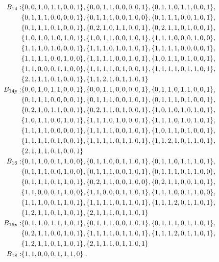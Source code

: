 \documentclass[11pt,a4paper]{article}
\begin{document}
\begin{align}
%
B_{14} :&
\{0, 0, 1, 0, 1, 1, 0, 0, 1\}, \{0, 0, 1, 1, 0, 0, 0, 0, 1\}, \{0, 1, 1, 0, 1, 1, 0, 0, 1\},  \nn
\{0, 1, 1, 1, 0, 0, 0, 0, 1\}, \{0, 1, 1, 1, 0, 0, 1, 0, 0\}, \{0, 1, 1, 1, 0, 0, 1, 0, 1\},  \nn
\{0, 1, 1, 1, 0, 1, 0, 0, 1\}, \{0, 2, 1, 0, 1, 1, 0, 0, 1\}, \{0, 2, 1, 1, 0, 1, 0, 0, 1\},  \nn
\{1, 0, 1, 0, 1, 0, 1, 0, 1\}, \{1, 0, 1, 1, 0, 0, 1, 0, 1\}, \{1, 1, 1, 0, 0, 0, 1, 0, 0\},  \nn
\{1, 1, 1, 0, 1, 0, 0, 0, 1\}, \{1, 1, 1, 0, 1, 0, 1, 0, 1\}, \{1, 1, 1, 1, 0, 0, 0, 0, 1\},  \nn
\{1, 1, 1, 1, 0, 0, 1, 0, 0\}, \{1, 1, 1, 1, 0, 0, 1, 0, 1\}, \{1, 0, 1, 1, 0, 1, 0, 0, 1\},  \nn
\{1, 1, 0, 0, 0, 1, 1, 0, 0\}, \{1, 1, 1, 1, 0, 1, 0, 0, 1\}, \{1, 1, 1, 1, 0, 1, 1, 0, 1\},  \nn
\{2, 1, 1, 1, 0, 1, 0, 0, 1\}, \{1, 1, 2, 1, 0, 1, 1, 0, 1\}
\nonumber\\
%
B_{14p} :&
\{0, 0, 1, 0, 1, 1, 0, 0, 1\}, \{0, 0, 1, 1, 0, 0, 0, 0, 1\}, \{0, 1, 1, 0, 1, 1, 0, 0, 1\},  \nn
\{0, 1, 1, 1, 0, 0, 0, 0, 1\}, \{0, 1, 1, 1, 0, 0, 1, 0, 1\}, \{0, 1, 1, 1, 0, 1, 0, 0, 1\},  \nn
\{0, 2, 1, 0, 1, 1, 0, 0, 1\}, \{0, 2, 1, 1, 0, 1, 0, 0, 1\}, \{1, 0, 1, 0, 1, 0, 1, 0, 1\},  \nn
\{1, 0, 1, 1, 0, 0, 1, 0, 1\}, \{1, 1, 1, 0, 1, 0, 0, 0, 1\}, \{1, 1, 1, 0, 1, 0, 1, 0, 1\},  \nn
\{1, 1, 1, 1, 0, 0, 0, 0, 1\}, \{1, 1, 1, 1, 0, 0, 1, 0, 1\}, \{1, 0, 1, 1, 0, 1, 0, 0, 1\},  \nn
\{1, 1, 1, 1, 0, 1, 0, 0, 1\}, \{1, 1, 1, 1, 0, 1, 1, 0, 1\}, \{1, 1, 2, 1, 0, 1, 1, 0, 1\},  \nn
\{2, 1, 1, 1, 0, 1, 0, 0, 1\}
\nonumber\\
%
B_{16} :&
\{0, 1, 1, 0, 0, 1, 1, 0, 0\}, \{0, 1, 1, 0, 0, 1, 1, 0, 1\}, \{0, 1, 1, 0, 1, 1, 1, 0, 1\},  \nn
\{0, 1, 1, 1, 0, 0, 1, 0, 0\}, \{0, 1, 1, 1, 0, 0, 1, 0, 1\}, \{0, 1, 1, 1, 0, 1, 1, 0, 0\},  \nn
\{0, 1, 1, 1, 0, 1, 1, 0, 1\}, \{0, 2, 1, 1, 0, 0, 1, 0, 0\}, \{0, 2, 1, 1, 0, 0, 1, 0, 1\},  \nn
\{1, 1, 0, 0, 0, 1, 1, 0, 0\}, \{1, 1, 0, 0, 0, 1, 1, 0, 1\}, \{1, 1, 1, 0, 0, 1, 1, 0, 0\},  \nn
\{1, 1, 1, 0, 0, 1, 1, 0, 1\}, \{1, 1, 1, 1, 0, 1, 1, 0, 1\}, \{1, 1, 1, 2, 0, 1, 1, 0, 1\},  \nn
\{1, 2, 1, 1, 0, 1, 1, 0, 1\}, \{2, 1, 1, 1, 0, 1, 1, 0, 1\}
\nonumber\\
%
B_{16p} :&
\{0, 1, 1, 0, 1, 1, 1, 0, 1\}, \{0, 1, 1, 1, 0, 0, 1, 0, 1\}, \{0, 1, 1, 1, 0, 1, 1, 0, 1\},  \nn
\{0, 2, 1, 1, 0, 0, 1, 0, 1\}, \{1, 1, 1, 1, 0, 1, 1, 0, 1\}, \{1, 1, 1, 2, 0, 1, 1, 0, 1\},  \nn
\{1, 2, 1, 1, 0, 1, 1, 0, 1\}, \{2, 1, 1, 1, 0, 1, 1, 0, 1\}
\nonumber\\
%
B_{18} :& \{1, 1, 0, 0, 0, 1, 1, 1, 0\}\;.
\label{eq:miB14}
\end{align}
%
%
\end{document}
